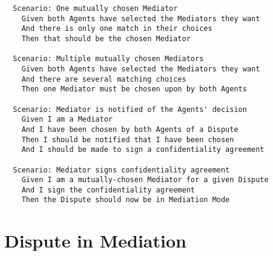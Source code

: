 \begin{lstlisting}
  Scenario: One mutually chosen Mediator
    Given both Agents have selected the Mediators they want
    And there is only one match in their choices
    Then that should be the chosen Mediator

  Scenario: Multiple mutually chosen Mediators
    Given both Agents have selected the Mediators they want
    And there are several matching choices
    Then one Mediator must be chosen upon by both Agents

  Scenario: Mediator is notified of the Agents' decision
    Given I am a Mediator
    And I have been chosen by both Agents of a Dispute
    Then I should be notified that I have been chosen
    And I should be made to sign a confidentiality agreement

  Scenario: Mediator signs confidentiality agreement
    Given I am a mutually-chosen Mediator for a given Dispute
    And I sign the confidentiality agreement
    Then the Dispute should now be in Mediation Mode
\end{lstlisting}

\section{Dispute in Mediation}

